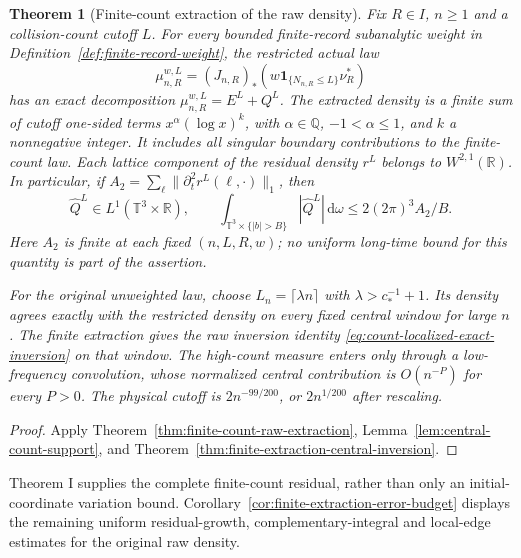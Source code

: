 \documentclass[11pt,reqno]{amsart}
\numberwithin{equation}{section}
\newtheorem{maintheorem}{Theorem}
\theoremstyle{definition}\newtheorem{definition}[theorem]{Definition}
\theoremstyle{remark}\newtheorem{remark}[theorem]{Remark}
\newcommand{\R}{\mathbb R}\newcommand{\Z}{\mathbb Z}\newcommand{\T}{\mathbb T}
\newcommand{\dd}{\,\mathrm d}\newcommand{\one}{\mathbf1}
\begin{document}
\begin{maintheorem}[Finite-count extraction of the raw density]
\label{thm:intro-finite-count-extraction}
Fix $R\in I$, $n\ge1$ and a collision-count cutoff $L$. For every
bounded finite-record subanalytic weight in
Definition~\ref{def:finite-record-weight}, the restricted actual law
\[
 \mu_{n,R}^{w,L}=(J_{n,R})_*
                    (w\one_{\{N_{n,R}\le L\}}\nu_R^*)
\]
has an exact decomposition $\mu_{n,R}^{w,L}=E^L+Q^L$.
The extracted density is a finite sum of cutoff one-sided terms
$x^\alpha(\log x)^k$, with $\alpha\in\mathbb Q$, $-1<\alpha\le1$,
and $k$ a nonnegative integer. It includes all singular boundary
contributions to the finite-count law. Each lattice component of the
residual density $r^L$ belongs to $W^{2,1}(\R)$. In particular, if
$A_2=\sum_\ell\|\partial_t^2 r^L(\ell,\cdot)\|_1$, then
\[
 \widehat Q^L\in L^1(\T^3\times\R),\qquad
 \int_{\T^3\times\{|b|>B\}}|\widehat Q^L|\dd\omega
                   \le 2(2\pi)^3 A_2/B .
\]
Here $A_2$ is finite at each fixed $(n,L,R,w)$; no uniform long-time
bound for this quantity is part of the assertion.

For the original unweighted law, choose $L_n=\lceil\lambda n\rceil$
with $\lambda>c_*^{-1}+1$. Its density agrees exactly with the restricted
density on every fixed central window for large $n$.
The finite extraction gives the raw inversion identity
\eqref{eq:count-localized-exact-inversion} on that window. The
high-count measure enters only through a low-frequency convolution,
whose normalized central contribution is $O(n^{-P})$ for every $P>0$.
The physical cutoff is $2n^{-99/200}$, or $2n^{1/200}$ after rescaling.
\end{maintheorem}
\begin{proof}
Apply Theorem~\ref{thm:finite-count-raw-extraction},
Lemma~\ref{lem:central-count-support}, and
Theorem~\ref{thm:finite-extraction-central-inversion}.
\end{proof}

Theorem I supplies the complete finite-count residual, rather than only
an initial-coordinate variation bound. Corollary~\ref{cor:finite-extraction-error-budget}
displays the remaining uniform residual-growth, complementary-integral
and local-edge estimates for the original raw density.
\end{document}
